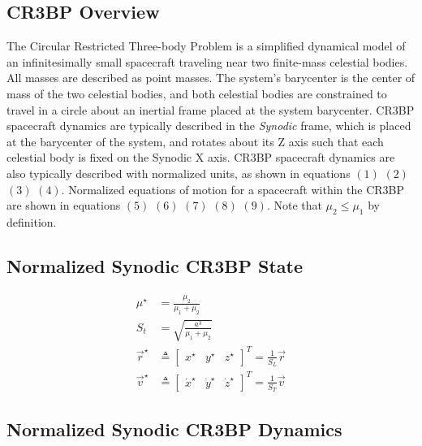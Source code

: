 \documentclass[conf]{new-aiaa}
\begin{document}
\begin{multicols}{2}
\section{CR3BP Overview}
The Circular Restricted Three-body Problem is a simplified 
dynamical model of an infinitesimally small spacecraft traveling
near two finite-mass celestial bodies. All masses are described
as point masses. The system's barycenter is the 
center of mass of the two celestial bodies, and both celestial 
bodies are constrained to travel in a circle about an inertial 
frame placed at the system barycenter. CR3BP spacecraft dynamics are 
typically described in the \textit{Synodic} frame, which is placed
at the barycenter of the system, and rotates about its Z axis such 
that each celestial body is fixed on the Synodic X axis. 
CR3BP spacecraft dynamics are also typically described with 
normalized units,
as shown in equations $\left(1\right)$ $\left(2\right)$ $\left(3\right)$
$\left(4\right)$. Normalized equations of motion for a spacecraft 
within the CR3BP are shown in equations 
$\left(5\right)$ $\left(6\right)$ $\left(7\right)$ $\left(8\right)$
$\left(9\right)$. Note that $\mu_2 \leq \mu_1$ by definition.

\subsection*{Normalized Synodic CR3BP State}
\begin{align}
    \mu^\star & = \frac{\mu_2}{\mu_1+\mu_2} \\
    S_t & = \sqrt{\frac{a^3}{\mu_1+\mu_2}} \\
    \overrightarrow{r}^\star & \triangleq \begin{bmatrix} x^\star & y^\star & z^\star \end{bmatrix}^T  = \frac{1}{S_L} \overrightarrow{r} \\
    \overrightarrow{v}^\star & \triangleq \begin{bmatrix} \dot{x}^\star & \dot{y}^\star & \dot{z}^\star \end{bmatrix}^T  = \frac{1}{S_T} \overrightarrow{v}
\end{align}

\subsection*{Normalized Synodic CR3BP Dynamics}


\end{multicols}
\end{document}

